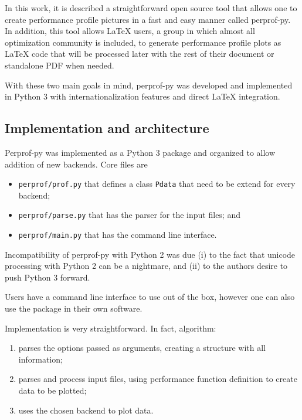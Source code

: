    In this work, it is described a straightforward open source tool that
    allows  one to create  performance profile pictures in a fast and easy
    manner called perprof-py.
    In addition, this tool  allows LaTeX users, a group in which almost
    all optimization community is included, to generate performance profile
    plots as LaTeX code that will be processed later  with the rest of their document 
    or standalone PDF when needed.

    With these two main goals in mind,  perprof-py was developed and 
    implemented in Python 3 with internationalization features and direct LaTeX
    integration.

\subsection*{Implementation and architecture}

    Perprof-py was implemented as a Python 3 package
    and organized to allow addition of new backends.
    Core files are
    \begin{itemize}
      \item {\tt perprof/prof.py} that defines a class {\tt Pdata} that need to
        be extend for every backend;
      \item {\tt perprof/parse.py} that has the parser for the input files; and
      \item {\tt perprof/main.py} that has the command line interface.
    \end{itemize}

    Incompatibility of perprof-py  with Python 2
    was due (i) to the fact that unicode processing with Python 2 can be a
    nightmare, and
    (ii) to the authors desire to push Python 3 forward.

    Users have a command line interface to use out of the box,
    however one can also use the package in their own software.

    Implementation is very straightforward. In fact, algorithm:
    \begin{enumerate}
      \item parses the options passed as arguments, creating a
        structure with all  information;
      \item parses and process  input files, using  
         performance function definition to create  data to be plotted;
      \item uses the chosen backend to plot  data.
    \end{enumerate}

